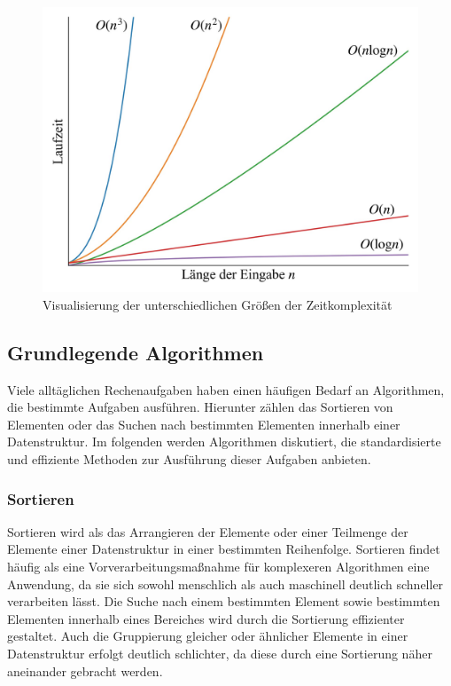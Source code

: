 \begin{figure}[!b]
	\includegraphics[scale=0.17]{Abbildungen/Time_complexities.jpg}
	\centering
	\caption{Visualisierung der unterschiedlichen Größen der Zeitkomplexität}
	\label{fig: time_complexity}
\end{figure}

\subsection{Grundlegende Algorithmen}
Viele alltäglichen Rechenaufgaben haben einen häufigen Bedarf an Algorithmen, die bestimmte Aufgaben ausführen. Hierunter zählen das Sortieren von Elementen oder das Suchen nach bestimmten Elementen innerhalb einer Datenstruktur. Im folgenden werden Algorithmen diskutiert, die standardisierte und effiziente Methoden zur Ausführung dieser Aufgaben anbieten.

\subsubsection{Sortieren}
Sortieren wird als das Arrangieren der Elemente oder einer Teilmenge der Elemente einer Datenstruktur in einer bestimmten Reihenfolge. Sortieren findet häufig als eine Vorverarbeitungsmaßnahme für komplexeren Algorithmen eine Anwendung, da sie sich sowohl menschlich als auch maschinell deutlich schneller verarbeiten lässt. Die Suche nach einem bestimmten Element sowie bestimmten Elementen innerhalb eines Bereiches wird durch die Sortierung effizienter gestaltet. Auch die Gruppierung gleicher oder ähnlicher Elemente in einer Datenstruktur erfolgt deutlich schlichter, da diese durch eine Sortierung näher aneinander gebracht werden. \autocite[153-154]{sanders_sequential_2019}

